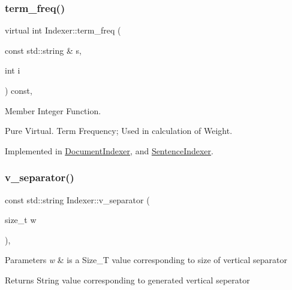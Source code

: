 \subsubsection{\texorpdfstring{term\+\_\+freq()}{term\_freq()}}
{\footnotesize\ttfamily virtual int Indexer\+::term\+\_\+freq (\begin{DoxyParamCaption}\item[{const std\+::string \&}]{s,  }\item[{int}]{i }\end{DoxyParamCaption}) const\hspace{0.3cm}{\ttfamily [protected]}, {}}



Member Integer Function. 

Pure Virtual. Term Frequency; Used in calculation of Weight. 

Implemented in \hyperlink{class_document_indexer_aba9275a0648629cab3772e75519938e8}{Document\+Indexer}, and \hyperlink{class_sentence_indexer_a54f8bbbce9e37c355fe435b26c16f1ac}{Sentence\+Indexer}.

\mbox{\label{class_indexer_ab8eadc78458b58c256a70208ea927d55}} 
\subsubsection{\texorpdfstring{v\+\_\+separator()}{v\_separator()}}
{\footnotesize\ttfamily const std\+::string Indexer\+::v\+\_\+separator (\begin{DoxyParamCaption}\item[{size\+\_\+t}]{w }\end{DoxyParamCaption})\hspace{0.3cm}{\ttfamily [static]}, {\ttfamily [protected]}}


\begin{DoxyParams}{Parameters}
{\em w} & is a Size\+\_\+T value corresponding to size of vertical separator \\
\hline
\end{DoxyParams}
\begin{DoxyReturn}{Returns}
String value corresponding to generated vertical seperator 
\end{DoxyReturn}
\mbox{\label{class_indexer_a8301fcbdf40afd926ab71d4767575d32}} 
